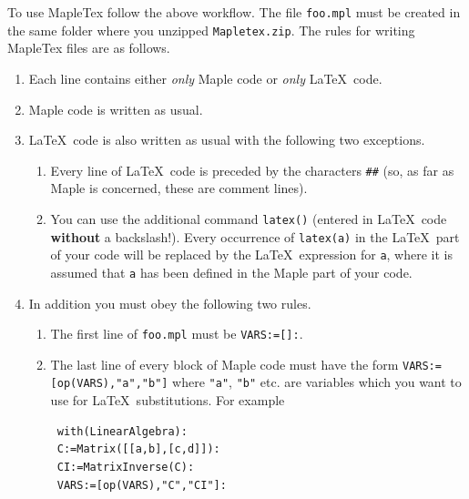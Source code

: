\documentclass{article}
\begin{document}
 \noindent To use \textsf{MapleTex} follow the above workflow.
 The file \texttt{foo.mpl} must be created in the same folder where you unzipped \texttt{Mapletex.zip}. The rules for writing 
 \textsf{MapleTex} files are as follows.
 \begin{enumerate}
 \item Each line contains either \emph{only} \textsf{Maple} code  or \emph{only} \LaTeX\ code. 
 \item \textsf{Maple} code is written as usual.
 \item \LaTeX\ code is also written as usual with the following two exceptions. 
 \begin{enumerate}
 \item Every line of \LaTeX\ code is preceded by the characters \texttt{\#\#} (so, as far as \textsf{Maple} 
 is concerned, these
 are comment lines).
 \item You can use the additional command \texttt{latex(\;)} (entered in \LaTeX\ code \textbf{without} a backslash!). 
 Every occurrence of \texttt{latex(a)} in the \LaTeX\  part of your code will be replaced by the \LaTeX\ expression for
  \texttt{a}, where it is assumed that \texttt{a} has been defined in the \textsf{Maple} part of your code.
 \end{enumerate}  
 \item In addition you must obey the following two rules.
 \begin{enumerate}
 \item The first line of \texttt{foo.mpl} must be \texttt{VARS:=[]:}.
 \item The last line of every block of \textsf{Maple} code must have the form \texttt{VARS:=[op(VARS),"a","b"]}
 where \texttt{"a"}, \texttt{"b"} etc. are variables which you want to use for \LaTeX\ substitutions.
 For example
 \begin{lstlisting}
 with(LinearAlgebra):
 C:=Matrix([[a,b],[c,d]]):
 CI:=MatrixInverse(C):
 VARS:=[op(VARS),"C","CI"]:
 \end{lstlisting}
 \end{enumerate}  
 \end{enumerate}  
\end{document}
